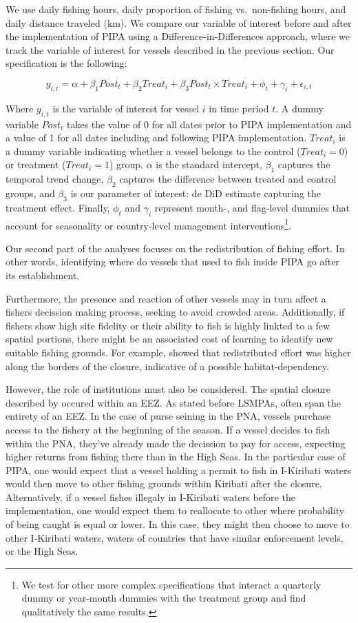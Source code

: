\documentclass[11pt,]{article}
\let\rmarkdownfootnote\footnote%
\def\footnote{\protect\rmarkdownfootnote}
\begin{document}
We use daily fishing hours, daily proportion of fishing vs.~non-fishing
hours, and daily distance traveled (km). We compare our variable of
interest before and after the implementation of PIPA using a
Difference-in-Differences approach, where we track the variable of
interest for vessels described in the previous section. Our
specification is the following:

\[
y_{i,t} = \alpha + \beta_1 Post_t + \beta_2 Treat_i + \beta_3 Post_t \times Treat_i + \phi_t + \gamma_i + \epsilon_{i,t}
\]

Where \(y_{i,t}\) is the variable of interest for vessel \(i\) in time
period \(t\). A dummy variable \(Post_t\) takes the value of 0 for all
dates prior to PIPA implementation and a value of 1 for all dates
including and following PIPA implementation. \(Treat_i\) is a dummy
variable indicating whether a vessel belongs to the control
(\(Treat_i = 0\)) or treatment (\(Treat_i = 1\)) group. \(\alpha\) is
the standard intercept, \(\beta_1\) captures the temporal trend change,
\(\beta_2\) captures the difference between treated and control groups,
and \(\beta_3\) is our parameter of interest: de DiD estimate capturing
the treatment effect. Finally, \(\phi_t\) and \(\gamma_i\) represent
month-, and flag-level dummies that account for seasonality or
country-level management
interventions\footnote{We test for other more complex specifications that interact a quarterly dummy or year-month dummies with the treatment group and find qualitatively the same results.}.

Our second part of the analyses focuses on the redistribution of fishing
effort. In other words, identifying where do vessels that used to fish
inside PIPA go after its establishment.

Furthermore, the presence and reaction of other vessels may in turn
affect a fishers decission making process, seeking to avoid crowded
areas. Additionally, if fishers show high site fidelity or their ability
to fish is highly linkted to a few spatial portions, there might be an
associated cost of learning to identify new suitable fishing grounds.
For example, \citet{elahi_2018} showed that redistributed effort was
higher along the borders of the closure, indicative of a possible
habitat-dependency.

However, the role of institutions must also be considered. The spatial
closure described by \citet{elahi_2018} occured within an EEZ. As stated
before LSMPAs, often span the entirety of an EEZ. In the case of purse
seining in the PNA, vessels purchase access to the fishery at the
beginning of the season. If a vessel decides to fish within the PNA,
they've already made the decission to pay for access, expecting higher
returns from fishing there than in the High Seas. In the particular case
of PIPA, one would expect that a vessel holding a permit to fish in
I-Kiribati waters would then move to other fishing grounds within
Kiribati after the closure. Alternatively, if a vessel fishes illegaly
in I-Kiribati waters before the implementation, one would expect them to
reallocate to other where probability of being caught is equal or lower.
In this case, they might then choose to move to other I-Kiribati waters,
waters of countries that have similar enforcement levels, or the High
Seas.
\end{document}
